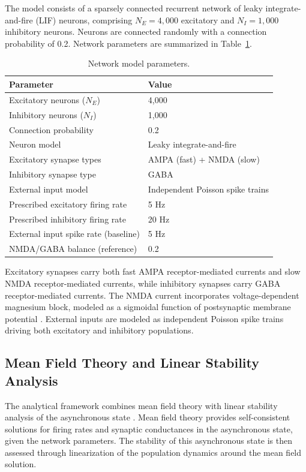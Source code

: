 \documentclass[11pt]{article}
\begin{document}
The model consists of a sparsely connected recurrent network of leaky integrate-and-fire (LIF) neurons, comprising $N_E = 4{,}000$ excitatory and $N_I = 1{,}000$ inhibitory neurons. Neurons are connected randomly with a connection probability of 0.2. Network parameters are summarized in Table~\ref{tab:network}.

\begin{table}[htbp]
\centering
\caption{Network model parameters.}
\label{tab:network}
\begin{tabular}{ll}
\toprule
Parameter & Value \\
\midrule
Excitatory neurons ($N_E$) & 4,000 \\
Inhibitory neurons ($N_I$) & 1,000 \\
Connection probability & 0.2 \\
Neuron model & Leaky integrate-and-fire \\
Excitatory synapse types & AMPA (fast) + NMDA (slow) \\
Inhibitory synapse type & GABA \\
External input model & Independent Poisson spike trains \\
Prescribed excitatory firing rate & 5 Hz \\
Prescribed inhibitory firing rate & 20 Hz \\
External input spike rate (baseline) & 5 Hz \\
NMDA/GABA balance (reference) & 0.2 \\
\bottomrule
\end{tabular}
\end{table}

Excitatory synapses carry both fast AMPA receptor-mediated currents and slow NMDA receptor-mediated currents, while inhibitory synapses carry GABA receptor-mediated currents. The NMDA current incorporates voltage-dependent magnesium block, modeled as a sigmoidal function of postsynaptic membrane potential \citep{jahr1990voltage}. External inputs are modeled as independent Poisson spike trains driving both excitatory and inhibitory populations.

\subsection{Mean Field Theory and Linear Stability Analysis}

The analytical framework combines mean field theory with linear stability analysis of the asynchronous state \citep{brunel2000dynamics, renart2010asynchronous}. Mean field theory provides self-consistent solutions for firing rates and synaptic conductances in the asynchronous state, given the network parameters. The stability of this asynchronous state is then assessed through linearization of the population dynamics around the mean field solution.
\end{document}
